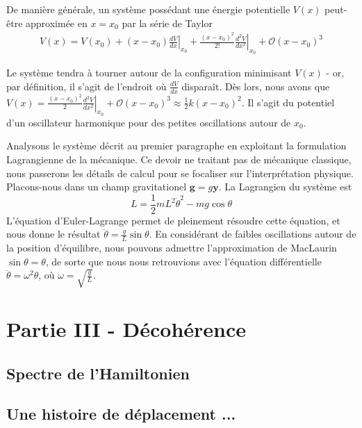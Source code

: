 \documentclass[11pt,oneside,a4paper]{article}
\begin{document}
De manière générale, un système possédant une énergie potentielle $V(x)$ peut-être approximée en $x=x_0$ par la série de Taylor
\begin{align}
  V(x) = V(x_0) + \left(x-x_0\right)\left.\frac{dV}{dx}\right|_{x_0} + \frac{\left(x-x_0\right)^2}{2!} \left.\frac{d^2V}{dx^2}\right|_{x_0} + \mathcal O(x-x_0)^3
\end{align} 

Le système tendra à tourner autour de la configuration minimisant $V(x)$ - or, par définition, il s'agit de l'endroit où $\frac{dV}{dx}$ disparaît. Dès lors, nous avons que $V(x) = \frac{\left(x-x_0\right)^2}{2} \left.\frac{d^2V}{dx^2}\right|_{x_0} + \mathcal O(x-x_0)^3 \approx \frac{1}{2}k\left(x-x_0\right)^2$. Il s'agit du potentiel d'un oscillateur harmonique pour des petites oscillations autour de $x_0$.

Analysons le système décrit au premier paragraphe en exploitant la formulation Lagrangienne de la mécanique. Ce devoir ne traitant pas de mécanique classique, nous passerons les détails de calcul pour se focaliser sur l'interprétation physique. Placons-nous dans un champ gravitationel $\bm{g} = g\bm{\bm{y}}$. La Lagrangien du système est 
\begin{equation}
  L = \frac{1}{2}mL^2\dot{\theta}^2 - mg\cos\theta 
\end{equation}
L'équation d'Euler-Lagrange permet de pleinement résoudre cette équation, et nous donne le résultat $\ddot{\theta} = \frac{g}{L}\sin\theta$. En considérant de faibles oscillations autour de la position d'équilibre, nous pouvons admettre l'approximation de MacLaurin $\sin\theta=\theta$, de sorte que nous nous retrouvions avec l'équation différentielle $\ddot{\theta} = \omega^2\theta$, où $\omega = \sqrt{\frac{g}{L}}$.

\section{Partie III - Décohérence}
\subsection{Spectre de l'Hamiltonien}
\subsection{Une histoire de déplacement ...}
\end{document}
